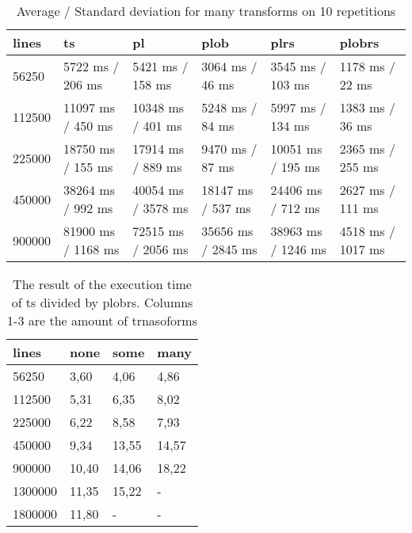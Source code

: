 \begin{table}[ht]
	\caption{Average / Standard deviation for many transforms on 10 repetitions}
	\label{tab:eval:many}
	\begin{tabular}{|l|l|l|l|l|l|}
		\hline
		lines  & ts                 & pl                 & plob               & plrs               & plobrs            \\
		\hline
		56250  & 5722 ms / 206 ms   & 5421 ms / 158 ms   & 3064 ms / 46 ms    & 3545 ms / 103 ms   & 1178 ms / 22 ms   \\
		112500 & 11097 ms / 450 ms  & 10348 ms / 401 ms  & 5248 ms / 84 ms    & 5997 ms / 134 ms   & 1383 ms / 36 ms   \\
		225000 & 18750 ms / 155 ms  & 17914 ms / 889 ms  & 9470 ms / 87 ms    & 10051 ms / 195 ms  & 2365 ms / 255 ms  \\
		450000 & 38264 ms / 992 ms  & 40054 ms / 3578 ms & 18147 ms / 537 ms  & 24406 ms / 712 ms  & 2627 ms / 111 ms  \\
		900000 & 81900 ms / 1168 ms & 72515 ms / 2056 ms & 35656 ms / 2845 ms & 38963 ms / 1246 ms & 4518 ms / 1017 ms \\
		\hline
	\end{tabular}
\end{table}

\begin{table}[ht]
	\caption{The result of the execution time of ts divided by plobrs. Columns 1-3 are the amount of trnasoforms}
	\label{tab:eval:ts_div_by_plobrs}
	\begin{tabular}{|l|l|l|l|}
		\hline
		lines   & none  & some  & many  \\
		\hline
		56250   & 3,60  & 4,06  & 4,86  \\
		112500  & 5,31  & 6,35  & 8,02  \\
		225000  & 6,22  & 8,58  & 7,93  \\
		450000  & 9,34  & 13,55 & 14,57 \\
		900000  & 10,40 & 14,06 & 18,22 \\
		1300000 & 11,35 & 15,22 & -     \\
		1800000 & 11,80 & -     & -     \\
		\hline
	\end{tabular}
\end{table}

